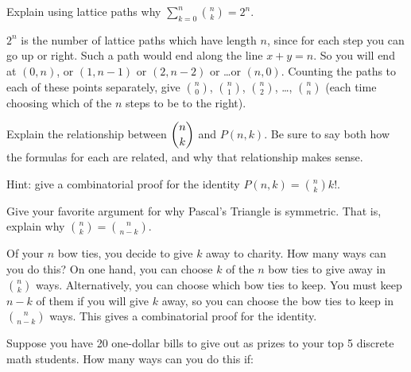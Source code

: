 \begin{questions}
	


\question Explain using lattice paths why $\sum_{k=0}^n {n \choose k} = 2^n$.

	\begin{answer}
		$2^n$ is the number of lattice paths which have length $n$, since for each step you can go up or right.  Such a path would end along the line $x + y = n$.  So you will end at $(0,n)$, or $(1,n-1)$ or $(2, n-2)$ or \ldots or $(n,0)$.  Counting the paths to each of these points separately, give ${n \choose 0}$, ${n \choose 1}$, ${n \choose 2}$, \ldots, ${n \choose n}$ (each time choosing which of the $n$ steps to be to the right).
	\end{answer}
	
	

 
\question Explain the relationship between $\displaystyle{n\choose k}$ and $P(n,k)$.  Be sure to say both how the formulas for each are related, and why that relationship makes sense.

	\begin{answer}
		Hint: give a combinatorial proof for the identity $P(n,k) = {n \choose k} k!$.
	\end{answer}
	
	


\question Give your favorite argument for why Pascal's Triangle is symmetric.  That is, explain why \({n \choose k} = {n \choose n-k}\).

	\begin{answer}
		Of your $n$ bow ties, you decide to give $k$ away to charity.  How many ways can you do this?  On one hand, you can choose $k$ of the $n$ bow ties to give away in ${n \choose k}$ ways.  Alternatively, you can choose which bow ties to keep.  You must keep $n -k$ of them if you will give $k$ away, so you can choose the bow ties to keep in ${n \choose n-k}$ ways.  This gives a combinatorial proof for the identity.
	\end{answer}
	
	



\question Suppose you have 20 one-dollar bills to give out as prizes to your top 5 discrete math students.  How many ways can you do this if:
\end{questions}
